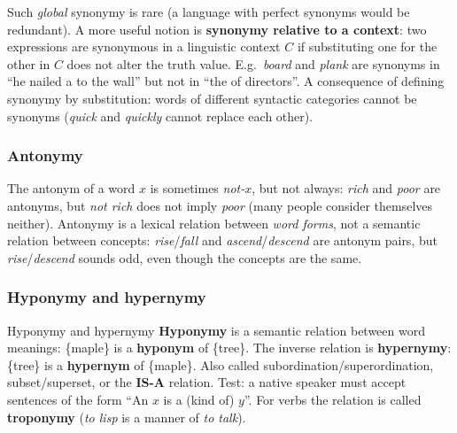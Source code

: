 Such \emph{global} synonymy is rare (a language with perfect synonyms would be
redundant). A more useful notion is \textbf{synonymy relative to a context}: two
expressions are synonymous in a linguistic context $C$ if substituting one for the other
in $C$ does not alter the truth value. E.g.\ \emph{board} and \emph{plank} are
synonyms in ``he nailed a \underline{\quad} to the wall'' but not in ``the
\underline{\quad} of directors''. A consequence of defining synonymy by substitution:
words of different syntactic categories cannot be synonyms (\emph{quick} and
\emph{quickly} cannot replace each other).

\subsubsection{Antonymy}

The antonym of a word $x$ is sometimes \emph{not-$x$}, but not always: \emph{rich} and
\emph{poor} are antonyms, but \emph{not rich} does not imply \emph{poor} (many people
consider themselves neither). Antonymy is a lexical relation between \emph{word forms},
not a semantic relation between concepts: \emph{rise}/\emph{fall} and
\emph{ascend}/\emph{descend} are antonym pairs, but \emph{rise}/\emph{descend} sounds
odd, even though the concepts are the same.

\subsubsection{Hyponymy and hypernymy}

\begin{nbdef}{Hyponymy and hypernymy}
\textbf{Hyponymy} is a semantic relation between word meanings: \{maple\} is a
\textbf{hyponym} of \{tree\}. The inverse relation is \textbf{hypernymy}: \{tree\} is a
\textbf{hypernym} of \{maple\}. Also called subordination/superordination,
subset/superset, or the \textbf{IS-A} relation. Test: a native speaker must accept
sentences of the form ``An $x$ is a (kind of) $y$''. For verbs the relation is called
\textbf{troponymy} (\emph{to lisp} is a manner of \emph{to talk}).
\end{nbdef}

